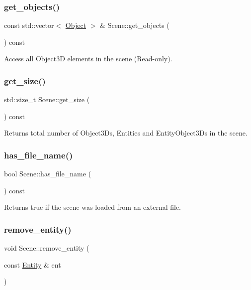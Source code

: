 \subsubsection{\texorpdfstring{get\+\_\+objects()}{get\_objects()}}
{\footnotesize\ttfamily const std\+::vector$<$ \mbox{\hyperlink{class_object}{Object}} $>$ \& Scene\+::get\+\_\+objects (\begin{DoxyParamCaption}{ }\end{DoxyParamCaption}) const}

Access all Object3D elements in the scene (Read-\/only). \mbox{\label{class_scene_afb4f9eb929eef70ad8580a00797442a4}} 
\subsubsection{\texorpdfstring{get\+\_\+size()}{get\_size()}}
{\footnotesize\ttfamily std\+::size\+\_\+t Scene\+::get\+\_\+size (\begin{DoxyParamCaption}{ }\end{DoxyParamCaption}) const}

Returns total number of Object3\+Ds, Entities and Entity\+Object3\+Ds in the scene. \mbox{\label{class_scene_a743728388c669fc24f8bd3630f785fbe}} 
\subsubsection{\texorpdfstring{has\+\_\+file\+\_\+name()}{has\_file\_name()}}
{\footnotesize\ttfamily bool Scene\+::has\+\_\+file\+\_\+name (\begin{DoxyParamCaption}{ }\end{DoxyParamCaption}) const}

Returns true if the scene was loaded from an external file. \mbox{\label{class_scene_a573afa94ed544adc352ee2b39470861e}} 
\subsubsection{\texorpdfstring{remove\+\_\+entity()}{remove\_entity()}}
{\footnotesize\ttfamily void Scene\+::remove\+\_\+entity (\begin{DoxyParamCaption}\item[{const \mbox{\hyperlink{class_entity}{Entity}} \&}]{ent }\end{DoxyParamCaption})}


